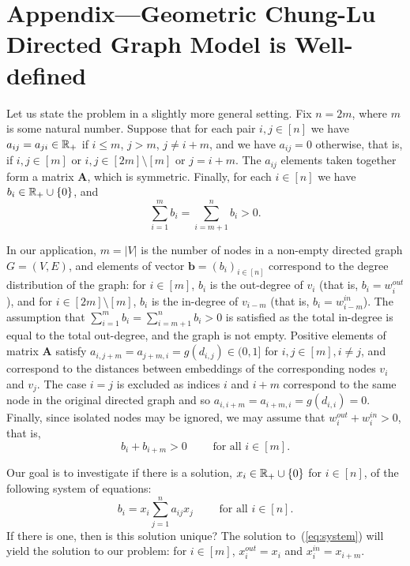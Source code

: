 
\parindent 20pt

\section{Appendix---Geometric Chung-Lu Directed Graph Model is Well-defined} \label{apdx:model}

Let us state the problem in a slightly more general setting. Fix $n=2m$, where $m$ is some natural number. Suppose that for each pair $i, j \in [n]$ we have $a_{ij}=a_{ji} \in {\mathbb R}_+$ if $i\leq m$, $j>m$, $j\neq i+m$, and we have $a_{ij}=0$ otherwise, that is, if $i,j\in [m]$ or $i,j \in [2m] \setminus [m]$ or $j=i+m$. The $a_{ij}$ elements taken together form a matrix $\textbf{A}$, which is symmetric. Finally, for each $i \in [n]$ we have $b_i \in {\mathbb R}_+ \cup \{0\}$, and 
\begin{equation}\label{eq:assumption}
\sum_{i=1}^{m}b_i=\sum_{i=m+1}^{n}b_i>0.
\end{equation}

\medskip

In our application, $m=|V|$ is the number of nodes in a non-empty directed graph $G=(V,E)$, and elements of vector $\mathbf{b} = (b_i)_{i\in[n]}$ correspond to the degree distribution of the graph: for $i\in [m]$, $b_i$ is the out-degree of $v_i$ (that is, $b_i=w_i^{out}$), and for $i\in [2m] \setminus [m]$, $b_i$ is the in-degree of $v_{i-m}$ (that is, $b_i=w_{i-m}^{in}$). The assumption that $\sum_{i=1}^{m}b_i=\sum_{i=m+1}^{n}b_i>0$ is satisfied as the total in-degree is equal to the total out-degree, and the graph is not empty. Positive elements of matrix $\textbf{A}$ satisfy $a_{i,j+m}=a_{j+m,i} = g(d_{i,j}) \in (0,1]$ for $i,j\in[m], i\neq j$, and correspond to the distances between embeddings of the corresponding nodes $v_i$ and $v_j$. The case $i=j$ is excluded as indices $i$ and $i+m$ correspond to the same node in the original directed graph and so $a_{i,i+m}=a_{i+m,i} = g(d_{i,i}) = 0$. Finally, since isolated nodes may be ignored, we may assume that $w_i^{out}+w_i^{in} > 0$, that is,
\begin{equation}\label{eq:non-degenerate}
b_i + b_{i+m} > 0 \qquad \text{ for all } i \in [m].
\end{equation}

Our goal is to investigate if there is a solution, $x_i \in {\mathbb R}_+\cup\{0\}$ for $i \in [n]$, of the following system of equations:
\begin{equation}\label{eq:system}
b_i = x_i \sum_{j=1}^na_{ij}x_j \qquad \text{ for all } i\in[n].
\end{equation}
If there is one, then is this solution unique? The solution to~(\ref{eq:system}) will yield the solution to our problem: for $i \in [m]$, $x_i^{out} = x_i$ and $x_i^{in}=x_{i+m}$.

